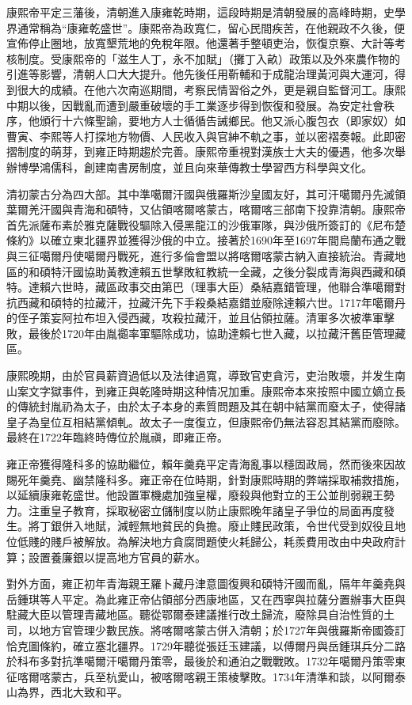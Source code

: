 康熙帝平定三藩後，清朝進入康雍乾時期，這段時期是清朝發展的高峰時期，史學界通常稱為“康雍乾盛世”。康熙帝為政寬仁，留心民間疾苦，在他親政不久後，便宣佈停止圈地，放寬墾荒地的免稅年限。他還著手整頓吏治，恢復京察、大計等考核制度。受康熙帝的「滋生人丁，永不加賦」（攤丁入畝）政策以及外來農作物的引進等影響，清朝人口大大提升。他先後任用靳輔和于成龍治理黃河與大運河，得到很大的成績。在他六次南巡期間，考察民情習俗之外，更是親自監督河工。康熙中期以後，因戰亂而遭到嚴重破壞的手工業逐步得到恢復和發展。為安定社會秩序，他頒行十六條聖諭，要地方人士循循告誡鄉民。他又派心腹包衣（即家奴）如曹寅、李熙等人打探地方物價、人民收入與官紳不軌之事，並以密褶奏報。此即密摺制度的萌芽，到雍正時期趨於完善。康熙帝重視對漢族士大夫的優遇，他多次舉辦博學鴻儒科，創建南書房制度，並且向來華傳教士學習西方科學與文化。

清初蒙古分為四大部。其中準噶爾汗國與俄羅斯沙皇國友好，其可汗噶爾丹先滅領葉爾羌汗國與青海和碩特，又佔領喀爾喀蒙古，喀爾喀三部南下投靠清朝。康熙帝首先派薩布素於雅克薩戰役驅除入侵黑龍江的沙俄軍隊，與沙俄所簽訂的《尼布楚條約》以確立東北疆界並獲得沙俄的中立。接著於1690年至1697年間烏蘭布通之戰與三征噶爾丹使噶爾丹戰死，進行多倫會盟以將喀爾喀蒙古納入直接統治。青藏地區的和碩特汗國協助黃教達賴五世擊敗紅教統一全藏，之後分裂成青海與西藏和碩特。達賴六世時，藏區政事交由第巴（理事大臣）桑結嘉錯管理，他聯合準噶爾對抗西藏和碩特的拉藏汗，拉藏汗先下手殺桑結嘉錯並廢除達賴六世。1717年噶爾丹的侄子策妄阿拉布坦入侵西藏，攻殺拉藏汗，並且佔領拉薩。清軍多次被準軍擊敗，最後於1720年由胤禵率軍驅除成功，協助達賴七世入藏，以拉藏汗舊臣管理藏區。

康熙晚期，由於官員薪資過低以及法律過寬，導致官吏貪污，吏治敗壞，并发生南山案文字獄事件，到雍正與乾隆時期这种情况加重。康熙帝本來按照中國立嫡立長的傳統封胤礽為太子，由於太子本身的素質問題及其在朝中結黨而廢太子，使得諸皇子為皇位互相結黨傾軋。故太子一度復立，但康熙帝仍無法容忍其結黨而廢除。最終在1722年臨終時傳位於胤禛，即雍正帝。

雍正帝獲得隆科多的協助繼位，賴年羹堯平定青海亂事以穩固政局，然而後來因故賜死年羹堯、幽禁隆科多。雍正帝在位時期，針對康熙時期的弊端採取補救措施，以延續康雍乾盛世。他設置軍機處加強皇權，廢殺與他對立的王公並削弱親王勢力。注重皇子教育，採取秘密立儲制度以防止康熙晚年諸皇子爭位的局面再度發生。將丁銀併入地賦，減輕無地貧民的負擔。廢止賤民政策，令世代受到奴役且地位低賤的賤戶被解放。為解決地方貪腐問題使火耗歸公，耗羨費用改由中央政府計算；設置養廉銀以提高地方官員的薪水。

對外方面，雍正初年青海親王羅卜藏丹津意圖復興和碩特汗國而亂，隔年年羹堯與岳鍾琪等人平定。為此雍正帝佔領部分西康地區，又在西寧與拉薩分置辦事大臣與駐藏大臣以管理青藏地區。聽從鄂爾泰建議推行改土歸流，廢除具自治性質的土司，以地方官管理少數民族。將喀爾喀蒙古併入清朝；於1727年與俄羅斯帝國簽訂恰克圖條約，確立塞北疆界。1729年聽從張廷玉建議，以傅爾丹與岳鍾琪兵分二路於科布多對抗準噶爾汗噶爾丹策零，最後於和通泊之戰戰敗。1732年噶爾丹策零東征喀爾喀蒙古，兵至杭愛山，被喀爾喀親王策棱擊敗。1734年清準和談，以阿爾泰山為界，西北大致和平。

